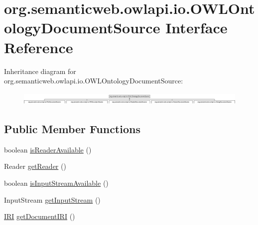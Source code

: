 \hypertarget{interfaceorg_1_1semanticweb_1_1owlapi_1_1io_1_1_o_w_l_ontology_document_source}{\section{org.\-semanticweb.\-owlapi.\-io.\-O\-W\-L\-Ontology\-Document\-Source Interface Reference}
\label{interfaceorg_1_1semanticweb_1_1owlapi_1_1io_1_1_o_w_l_ontology_document_source}
}
Inheritance diagram for org.\-semanticweb.\-owlapi.\-io.\-O\-W\-L\-Ontology\-Document\-Source\-:\begin{figure}[H]
\begin{center}
\leavevmode
\includegraphics[height=0.641834cm]{interfaceorg_1_1semanticweb_1_1owlapi_1_1io_1_1_o_w_l_ontology_document_source}
\end{center}
\end{figure}
\subsection*{Public Member Functions}
\begin{DoxyCompactItemize}
\item 
boolean \hyperlink{interfaceorg_1_1semanticweb_1_1owlapi_1_1io_1_1_o_w_l_ontology_document_source_afde55562eda873b241b32ef90f2b66c6}{is\-Reader\-Available} ()
\item 
Reader \hyperlink{interfaceorg_1_1semanticweb_1_1owlapi_1_1io_1_1_o_w_l_ontology_document_source_a00627f57775a820a8f8fdfd6b7e75c68}{get\-Reader} ()
\item 
boolean \hyperlink{interfaceorg_1_1semanticweb_1_1owlapi_1_1io_1_1_o_w_l_ontology_document_source_a4dbf1b82137983881468ec59f85d88d6}{is\-Input\-Stream\-Available} ()
\item 
Input\-Stream \hyperlink{interfaceorg_1_1semanticweb_1_1owlapi_1_1io_1_1_o_w_l_ontology_document_source_a5a72e8c492895465295bf5c3609c97ac}{get\-Input\-Stream} ()
\item 
\hyperlink{classorg_1_1semanticweb_1_1owlapi_1_1model_1_1_i_r_i}{I\-R\-I} \hyperlink{interfaceorg_1_1semanticweb_1_1owlapi_1_1io_1_1_o_w_l_ontology_document_source_ad7904700cf9be0b4b52dd37e4c55c856}{get\-Document\-I\-R\-I} ()
\end{DoxyCompactItemize}


